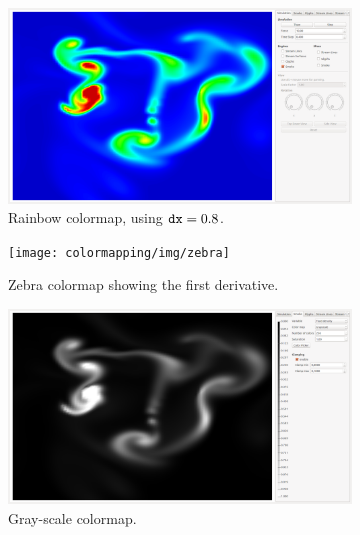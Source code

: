 \begin{figure}
	\centering
	\begin{subfigure}{0.44\textwidth}
		\centering
		\includegraphics[width=\textwidth, trim={35px 30px 430px 30px}, clip]{colormapping/img/rainbow.png}
		\caption{Rainbow colormap, using $\mathtt{dx} = 0.8$.}
		\label{fig:colormapping:intro:differntColorMaps:rainbow}
	\end{subfigure}
	\begin{subfigure}{0.44\textwidth}
		\centering
		\texttt{[image: colormapping/img/zebra]}
		\caption{Zebra colormap showing the first derivative.}
		\label{fig:colormapping:intro:differntColorMaps:zebra}
	\end{subfigure}	
	\begin{subfigure}{0.44\textwidth}
		\centering
		\includegraphics[width=\textwidth, trim={35px 30px 430px 30px}, clip]{colormapping/img/grayscale}
		\caption{Gray-scale colormap.}
		\label{fig:colormapping:intro:differntColorMaps:grayscale}
	\end{subfigure}	
	\begin{subfigure}{0.44\textwidth}
		\centering

\end{subfigure}
\end{figure}
